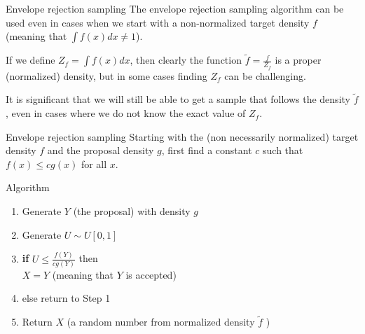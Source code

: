 \documentclass[8pt]{beamer}
\begin{document}
\begin{frame}{Envelope rejection sampling}
The envelope rejection sampling algorithm can be used even in cases when we start with a non-normalized target density $f$ (meaning that $\int f(x) dx \neq 1$).

\vspace{2mm}

If we define $Z_f=\int f(x) dx$, then clearly the function $\displaystyle{\tilde{f}=\frac{f}{Z_f}}$
is a proper (normalized) density, but in some cases finding $Z_f$ can be challenging.

\vspace{2mm}

It is significant that we will still be able to get a sample that follows the density $\tilde{f}$, even in cases where we do not know the exact value of $Z_f$.
\end{frame}


\begin{frame}{Envelope rejection sampling}
Starting with the (non necessarily normalized) target density $f$ and the proposal density $g$, first find a constant $c$ such that $f(x)\leq c g(x)$ for all $x$.

\vspace{2mm}

\alert{Algorithm}

\begin{enumerate}
	\item Generate $Y$ (the proposal) with density $g$ 
	\item Generate $U \sim U[0,1]$
	\item {\bf if} $\displaystyle{U \leq \frac{f(Y)}{cg(Y)}}$ then \\
       $X=Y$ (meaning that $Y$ is accepted)\\  
	\item else return to Step 1
	\item Return $X$ (a random number from normalized density $\tilde{f}$ )
\end{enumerate}
\end{frame}
\end{document}
